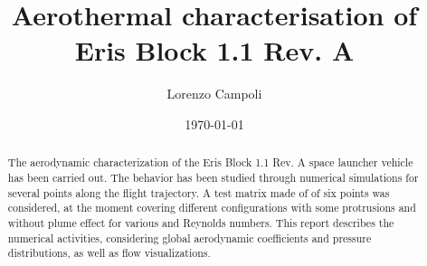 \documentclass[12pt]{article}
\title{Aerothermal characterisation of \\ {Eris Block 1.1 Rev. A}}
\author{Lorenzo Campoli}
\date{\today}
\begin{document}
\setmainfont{Arial}

\maketitle

\renewcommand{\arraystretch}{1.5} %
\setlength{\tabcolsep}{8pt}       %

\begin{center}
\end{center}

\begin{abstract}
\noindent The aerodynamic characterization of the Eris Block 1.1 Rev. A space launcher vehicle has been carried out. The behavior has been studied through numerical simulations for several points along the flight trajectory. A test matrix made of of six points was considered, at the moment covering different configurations with some protrusions and without plume effect for various and Reynolds numbers. This report describes the numerical activities, considering global aerodynamic coefficients and pressure distributions, as well as flow visualizations. 
\end{abstract}

\newpage

\makenomenclature

\newpage

\printnomenclature



\tableofcontents
\end{document}
